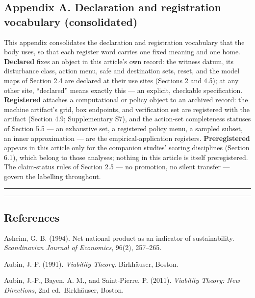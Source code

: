 \documentclass[11pt]{article}
\begin{document}
\subsection{Appendix A. Declaration and registration vocabulary
(consolidated)}\label{appendix-a.-declaration-and-registration-vocabulary-consolidated}

This appendix consolidates the declaration and registration vocabulary
that the body uses, so that each register word carries one fixed meaning
and one home. \textbf{Declared} fixes an object in this article's own
record: the witness datum, its disturbance class, action menu, safe and
destination sets, reset, and the model maps of Section 2.4 are declared
at their use sites (Sections 2 and 4.5); at any other site, ``declared''
means exactly this --- an explicit, checkable specification.
\textbf{Registered} attaches a computational or policy object to an
archived record: the machine artifact's grid, box endpoints, and
verification set are registered with the artifact (Section 4.9;
Supplementary S7), and the action-set completeness statuses of Section
5.5 --- an exhaustive set, a registered policy menu, a sampled subset,
an inner approximation --- are the empirical-application registers.
\textbf{Preregistered} appears in this article only for the companion
studies' scoring disciplines (Section 6.1), which belong to those
analyses; nothing in this article is itself preregistered. The
claim-status rules of Section 2.5 --- no promotion, no silent transfer
--- govern the labelling throughout.

\begin{center}\rule{0.5\linewidth}{0.5pt}\end{center}

\begin{center}\rule{0.5\linewidth}{0.5pt}\end{center}

\subsection{References}\label{references}

Asheim, G. B. (1994). Net national product as an indicator of
sustainability. \emph{Scandinavian Journal of Economics}, 96(2),
257--265.

Aubin, J.-P. (1991). \emph{Viability Theory}. Birkh\"auser, Boston.

Aubin, J.-P., Bayen, A. M., and Saint-Pierre, P. (2011). \emph{Viability
Theory: New Directions}, 2nd ed.~Birkh\"auser, Boston.
\end{document}
